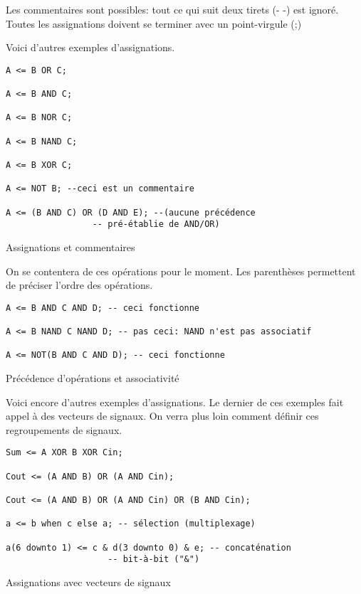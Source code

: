 \documentclass[11pt]{article}
\begin{document}
Les commentaires sont possibles: tout ce qui suit deux tirets (- -)
est ignoré.  Toutes les assignations doivent se terminer avec un
point-virgule (;)

Voici d'autres exemples d'assignations.

\begin{listing}[htbp]
\begin{verbatim}
A <= B OR C;

A <= B AND C;

A <= B NOR C;

A <= B NAND C;

A <= B XOR C;

A <= NOT B; --ceci est un commentaire

A <= (B AND C) OR (D AND E); --(aucune précédence 
			     -- pré-établie de AND/OR)
\end{verbatim}
\caption{Assignations et commentaires}
\end{listing}

On se contentera de ces opérations pour le moment. Les parenthèses
permettent de préciser l'ordre des opérations.

\begin{listing}[htbp]
\begin{verbatim}
A <= B AND C AND D; -- ceci fonctionne

A <= B NAND C NAND D; -- pas ceci: NAND n'est pas associatif

A <= NOT(B AND C AND D); -- ceci fonctionne
\end{verbatim}
\caption{Précédence d'opérations et associativité}
\end{listing}

Voici encore d'autres exemples d'assignations.  Le dernier de ces exemples
fait appel à des vecteurs de signaux. On verra plus loin comment
définir ces regroupements de signaux.


\begin{listing}[htbp]
\begin{verbatim}
Sum <= A XOR B XOR Cin;

Cout <= (A AND B) OR (A AND Cin);

Cout <= (A AND B) OR (A AND Cin) OR (B AND Cin);

a <= b when c else a; -- sélection (multiplexage)

a(6 downto 1) <= c & d(3 downto 0) & e; -- concaténation 
					-- bit-à-bit ("&")

\end{verbatim}
\caption{Assignations avec vecteurs de signaux}
\end{listing}
\end{document}
